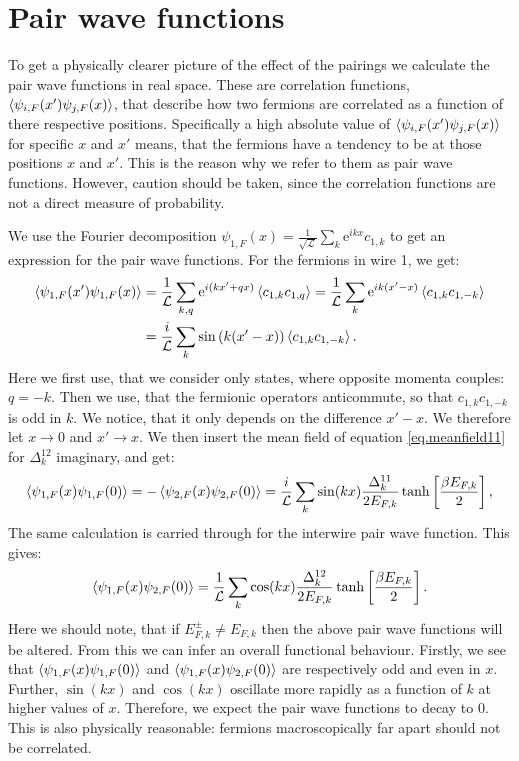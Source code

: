 \section{Pair wave functions} \label{sec.pairwavefunctions}
To get a physically clearer picture of the effect of the pairings we calculate the pair wave functions in real space. These are correlation functions, $\braket{\psi_{i,F}(x')\psi_{j,F}(x)}$, that describe how two fermions are correlated as a function of there respective positions. Specifically a high absolute value of $\braket{\psi_{i,F}(x')\psi_{j,F}(x)}$ for specific $x$ and $x'$ means, that the fermions have a tendency to be at those positions $x$ and $x'$. This is the reason why we refer to them as pair wave functions. However, caution should be taken, since the correlation functions are not a direct measure of probability. 

We use the Fourier decomposition $\psi_{1,F}(x) = \frac{1}{\sqrt{\mathcal{L}}} \sum_k \text{e}^{ikx} c_{1,k}$ to get an expression for the pair wave functions. For the fermions in wire 1, we get:
\begin{align}
\braket{\psi_{1,F}(x')\psi_{1,F}(x)} 
&= \frac{1}{\mathcal{L}} \sum_{k,q} \text{e}^{i(kx' + qx)}\braket{c_{1,k}c_{1,q}} = \frac{1}{\mathcal{L}} \sum_{k} \text{e}^{ik(x' - x)}\braket{c_{1,k}c_{1,-k}} \nonumber \\
&= \frac{i}{\mathcal{L}} \sum_{k} \sin\left(k(x' - x)\right)\braket{c_{1,k}c_{1,-k}}. \nonumber 
\end{align}
Here we first use, that we consider only states, where opposite momenta couples: $q = -k$. Then we use, that the fermionic operators anticommute, so that $c_{1,k}c_{1,-k}$ is odd in $k$. We notice, that it only depends on the difference $x' - x$. We therefore let $x \to 0$ and $x' \to x$. We then insert the mean field of equation \eqref{eq.meanfield11} for $\Delta^{12}_k$ imaginary, and get:
\begin{equation}
\braket{\psi_{1,F}(x)\psi_{1,F}(0)} = - \braket{\psi_{2,F}(x)\psi_{2,F}(0)} = \frac{i}{\mathcal{L}}\sum_k \sin(kx) \frac{\Delta^{11}_k}{2E_{F,k}}\tanh\left[\frac{ \beta E_{F,k} }{2}\right], 
\label{eq.intrawirepairwavefunction}
\end{equation}
The same calculation is carried through for the interwire pair wave function. This gives:
\begin{equation}
\braket{\psi_{1,F}(x)\psi_{2,F}(0)} = \frac{1}{\mathcal{L}}\sum_k \cos(kx) \frac{\Delta^{12}_k}{2E_{F,k}}\tanh\left[\frac{ \beta E_{F,k} }{2}\right].
\label{eq.interwirepairwavefunction}
\end{equation} 
Here we should note, that if $E^\pm_{F,k} \neq E_{F,k}$ then the above pair wave functions will be altered. From this we can infer an overall functional behaviour. Firstly, we see that $\braket{\psi_{1,F}(x)\psi_{1,F}(0)}$ and $\braket{\psi_{1,F}(x)\psi_{2,F}(0)}$ are respectively odd and even in $x$. Further, $\sin(kx)$ and $\cos(kx)$ oscillate more rapidly as a function of $k$ at higher values of $x$. Therefore, we expect the pair wave functions to decay to 0. This is also physically reasonable: fermions macroscopically far apart should not be correlated. 

